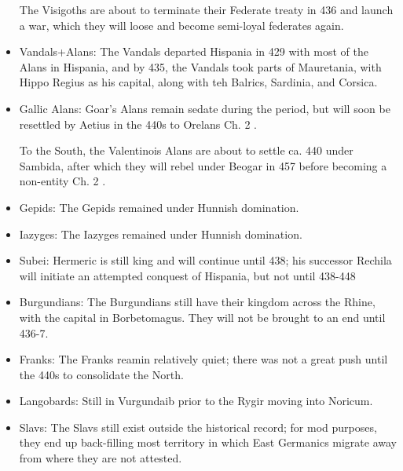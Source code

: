 \documentclass{article}
\newcommand{\specificCite}[1]{\tiny #1 \normalsize}
\begin{document}
\begin{itemize}
		The Visigoths are about to terminate their Federate treaty in 436 and launch a war, which they will loose and become semi-loyal federates again.
		
		\item Vandals+Alans:\newline
		The Vandals departed Hispania in 429 with most of the Alans in Hispania, and by 435, the Vandals took parts of Mauretania, with Hippo Regius as his capital, along with teh Balrics, Sardinia, and Corsica. 
		
		\item Gallic Alans:\newline
		Goar's Alans remain sedate during the period, but will soon be resettled by Aetius in the 440s to Orelans \cite{BachrachAlans}\specificCite{Ch. 2}.
		
		To the South, the Valentinois Alans are about to settle ca. 440 under Sambida, after which they will rebel under Beogar in 457 before becoming a non-entity \cite{BachrachAlans}\specificCite{Ch. 2}.
		
		\item Gepids:\newline
		The Gepids remained under Hunnish domination.
		
		\item Iazyges:\newline
		The Iazyges remained under Hunnish domination.
		
		\item Subei:\newline
		Hermeric is still king and will continue until 438; his successor Rechila will initiate an attempted conquest of Hispania, but not until 438-448
		
		\item Burgundians:\newline
		The Burgundians still have their kingdom across the Rhine, with the capital in Borbetomagus.
		They will not be brought to an end until 436-7.
		
		\item Franks:\newline
		The Franks reamin relatively quiet; there was not a great push until the 440s to consolidate the North.
		
		\item Langobards:\newline
		Still in Vurgundaib prior to the Rygir moving into Noricum.
		
		\item Slavs:\newline
		The Slavs still exist outside the historical record; for mod purposes, they end up back-filling most territory in which East Germanics migrate away from where they are not attested.
	\end{itemize}
	
\end{document}
